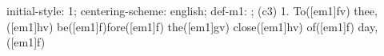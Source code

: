 initial-style: 1;
centering-scheme: english;
def-m1: \grealign;
(c3) 1. To([em1]fv) thee,([em1]hv) be([em1]f)fore([em1]f) the([em1]gv) close([em1]hv) of([em1]f) day,([em1]f)